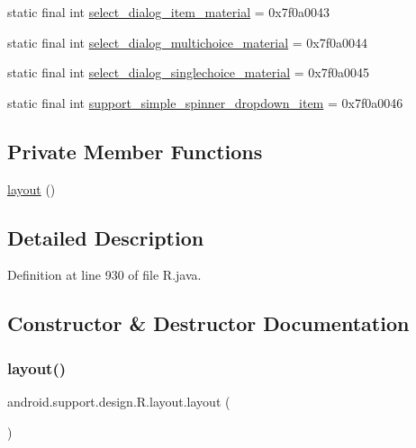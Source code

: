 \begin{DoxyCompactItemize}
static final int \mbox{\hyperlink{classandroid_1_1support_1_1design_1_1_r_1_1layout_aab2090fcba37187805603c08746aa8cc}{select\+\_\+dialog\+\_\+item\+\_\+material}} = 0x7f0a0043
\item 
static final int \mbox{\hyperlink{classandroid_1_1support_1_1design_1_1_r_1_1layout_a3d2eb3f803ab59c599c7022c15479bb8}{select\+\_\+dialog\+\_\+multichoice\+\_\+material}} = 0x7f0a0044
\item 
static final int \mbox{\hyperlink{classandroid_1_1support_1_1design_1_1_r_1_1layout_af908cc6a223fbe33d22bb3088dfc11b2}{select\+\_\+dialog\+\_\+singlechoice\+\_\+material}} = 0x7f0a0045
\item 
static final int \mbox{\hyperlink{classandroid_1_1support_1_1design_1_1_r_1_1layout_a4de293b6e7223138532dd164026cd9c6}{support\+\_\+simple\+\_\+spinner\+\_\+dropdown\+\_\+item}} = 0x7f0a0046
\end{DoxyCompactItemize}
\subsection*{Private Member Functions}
\begin{DoxyCompactItemize}
\item 
\mbox{\hyperlink{classandroid_1_1support_1_1design_1_1_r_1_1layout_a233cc3e001998928e45ff36ce9af8e3e}{layout}} ()
\end{DoxyCompactItemize}


\subsection{Detailed Description}


Definition at line 930 of file R.\+java.



\subsection{Constructor \& Destructor Documentation}
\mbox{\label{classandroid_1_1support_1_1design_1_1_r_1_1layout_a233cc3e001998928e45ff36ce9af8e3e}} 
\subsubsection{\texorpdfstring{layout()}{layout()}}
{\footnotesize\ttfamily android.\+support.\+design.\+R.\+layout.\+layout (\begin{DoxyParamCaption}{ }\end{DoxyParamCaption})\hspace{0.3cm}{\ttfamily [private]}}



